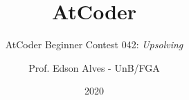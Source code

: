 \title{AtCoder}
\subtitle{AtCoder Beginner Contest 042: {\it Upsolving}}
\author{Prof. Edson Alves - UnB/FGA}
\date{2020}
